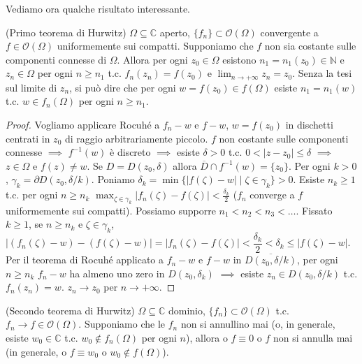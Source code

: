 Vediamo ora qualche risultato interessante.

\begin{thm}
  (Primo teorema di Hurwitz) $\Omega \subseteq \mathbb{C}$ aperto, $\{f_n\} \subset \mathcal{O}(\Omega)$ convergente a $f\in \mathcal{O}(\Omega)$ uniformemente sui compatti. Supponiamo che $f$ non sia costante sulle componenti connesse di $\Omega$.
  Allora per ogni $z_0 \in \Omega$ esistono $n_1=n_1(z_0) \in \mathbb{N}$ e $z_n \in \Omega$ per ogni $n \ge n_1$ t.c. $f_n(z_n)=f(z_0)$ e $\displaystyle \lim_{n \rightarrow +\infty} z_n=z_0$.
  Senza la tesi sul limite di $z_n$, si può dire che per ogni $w=f(z_0) \in f(\Omega)$ esiste $n_1=n_1(w)$ t.c. $w \in f_n(\Omega)$ per ogni $n \ge n_1$.
\end{thm}

\begin{proof}
  Vogliamo applicare Rocuhé a $f_n-w$ e $f-w$, $w=f(z_0)$ in dischetti centrati in $z_0$ di raggio arbitrariamente piccolo. $f$ non costante sulle componenti connesse $\implies$ $f^{-1}(w)$ è discreto $\implies$ esiste $\delta>0$ t.c. $0<|z-z_0| \le \delta$ $\implies$ $z \in \Omega$ e $f(z) \not=w$.
  Se $D=D(z_0, \delta)$ allora $\overline{D} \cap f^{-1}(w)=\{z_0\}$. Per ogni $k>0$, $\gamma_k=\partial D(z_0, \delta/k)$. Poniamo $\delta_k=\min\{|f(\zeta)-w| \mid \zeta \in \gamma_k\}>0$.
  Esiste $n_k \ge 1$ t.c. per ogni $n \ge n_k$ $\displaystyle \max_{\zeta \in \gamma_k} |f_n(\zeta)-f(\zeta)|<\frac{\delta_k}{2}$ ($f_n$ converge a $f$ uniformemente sui compatti). Possiamo supporre $n_1<n_2<n_3<\dots$.
  Fissato $k \ge 1$, se $n \ge n_k$ e $\zeta \in \gamma_k$, $|(f_n(\zeta)-w)-(f(\zeta)-w)|=|f_n(\zeta)-f(\zeta)|<\dfrac{\delta_k}{2}<\delta_k \le |f(\zeta)-w|$.
  Per il teorema di Rocuhé applicato a $f_n-w$ e $f-w$ in $\overline{D(z_0, \delta/k)}$, per ogni $n \ge n_k$ $f_n-w$ ha almeno uno zero in $D(z_0, \delta_k)$ $\implies$ esiste $z_n \in D(z_0, \delta/k)$ t.c. $f_n(z_n)=w$. $z_n \rightarrow z_0$ per $n \rightarrow +\infty$.
\end{proof}

\begin{cor}
  (Secondo teorema di Hurwitz) $\Omega \subseteq \mathbb{C}$ dominio, $\{f_n\} \subset \mathcal{O}(\Omega)$ t.c. $f_n \rightarrow f \in \mathcal{O}(\Omega)$. Supponiamo che le $f_n$ non si annullino mai (o, in generale, esiste $w_0 \in \mathbb{C}$ t.c. $w_0 \not\in f_n(\Omega)$ per ogni $n$),
  allora o $f \equiv 0$ o $f$ non si annulla mai (in generale, o $f \equiv w_0$ o $w_0 \not\in f(\Omega)$).
\end{cor}

